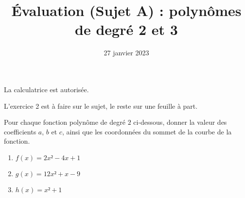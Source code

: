 \documentclass[
	classe=$1^{ere}STI2D$,
	headerTitle=Évaluation\space Chapitre\space 4
]{évaluation}
\date{27 janvier 2023}
\begin{document}
\title{Évaluation (Sujet A) : polynômes de degré 2 et 3}
\maketitle

\begin{tcolorbox}
	La calculatrice est autorisée.

	L'exercice 2 est à faire sur le sujet, le reste sur une feuille à part.
\end{tcolorbox}

\begin{exercice}
	Pour chaque fonction polynôme de degré $2$ ci-dessous, donner la valeur des coefficients $a$, $b$ et $c$, ainsi que les coordonnées du sommet de la courbe de la fonction.
	\begin{enumerate}
		\item $f(x) = 2x² - 4x + 1$
		\item $g(x) = 12x² + x - 9$
		\item $h(x) = x² + 1$
	\end{enumerate}
\end{exercice}
\end{document}
